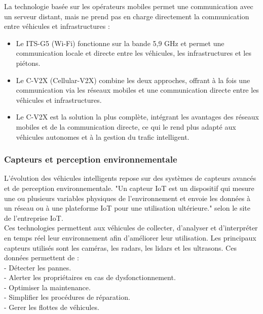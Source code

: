 La technologie basée sur les opérateurs mobiles permet une communication avec un serveur distant, mais ne prend pas en charge directement la communication entre véhicules et infrastructures : 
\begin{itemize}
    \item Le ITS-G5 (Wi-Fi) fonctionne sur la bande 5,9 GHz et permet une communication locale et directe entre les véhicules, les infrastructures et les piétons.
    \item Le C-V2X (Cellular-V2X) combine les deux approches, offrant à la fois une communication via les réseaux mobiles et une communication directe entre les véhicules et infrastructures.
    \item Le C-V2X est la solution la plus complète, intégrant les avantages des réseaux mobiles et de la communication directe, ce qui le rend plus adapté aux véhicules autonomes et à la gestion du trafic intelligent.
\end{itemize}

\subsubsection{Capteurs et perception environnementale}
L'évolution des véhicules intelligents repose sur des systèmes de capteurs avancés et de perception environnementale. "Un capteur IoT est un dispositif qui mesure une ou plusieurs variables physiques de l'environnement et envoie les données à un réseau ou à une plateforme IoT pour une utilisation ultérieure." selon le site de l'entreprise IoT\cite{iot_capteur}.\\
Ces technologies permettent aux véhicules de collecter, d'analyser et d'interpréter en temps réel leur environnement afin d'améliorer leur utilisation.
Les principaux capteurs utilisés sont les caméras, les radars, les lidars et les ultrasons.
Ces données permettent de :\\
- Détecter les pannes. \\
- Alerter les propriétaires en cas de dysfonctionnement. \\
- Optimiser la maintenance. \\
- Simplifier les procédures de réparation. \\
- Gerer les flottes de véhicules. \\


